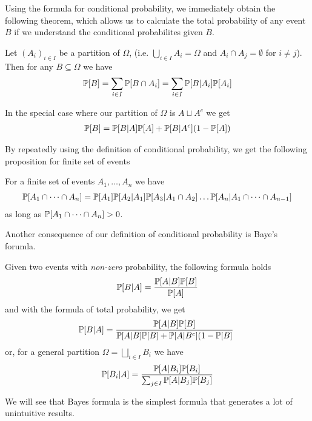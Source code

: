 Using the formula for conditional probability, we immediately obtain the following theorem, which allows us to calculate the total probability of any event $B$ if we understand the conditional probabilites given $B$.
\begin{thm}
  Let $(A_i)_{i \in I}$ be a partition of $\Omega$, (i.e. $\bigcup_{i \in I}A_i = \Omega$ and $A_i \cap A_j = \emptyset$ for $i \neq j$). Then for any $B \subseteq \Omega$ we have
  \begin{align*}
    \mathbb{P}[B] = \sum_{i \in I}\mathbb{P}[B \cap A_i] = \sum_{i \in I}\mathbb{P}[B|A_i]\mathbb{P}[A_i]
  \end{align*}
\end{thm}
In the special case where our partition of $\Omega$ is $A \sqcup A^{c}$ we get
\begin{align*}
  \mathbb{P}[B] = \mathbb{P}[B|A]\mathbb{P}[A] + \mathbb{P}[B|A^{c}](1 - \mathbb{P}[A])
\end{align*}

By repeatedly using the definition of conditional probability, we get the following proposition for finite set of events
\begin{prop}[]
  For a finite set of events $A_{1}, \ldots, A_{n}$ we have
  \begin{align*}
    \mathbb{P}[A_{1}\cap \dots\cap A_{n}] = \mathbb{P}[A_1]\mathbb{P}[A_2|A_1]\mathbb{P}[A_3|A_1 \cap A_2] \dots \mathbb{P}[A_n|A_{1}\cap \dots \cap A_{n-1}]
  \end{align*}
  as long as $\mathbb{P}[A_{1}\cap \dots \cap  A_{n}] > 0$.
\end{prop}


Another consequence of our definition of conditional probability is Baye's forumla.
\begin{cor}
Given two events with \emph{non-zero} probability, the following formula holds
\begin{align*}
  \mathbb{P}[B|A] = \frac{\mathbb{P}[A|B]\mathbb{P}[B]}{\mathbb{P}[A]}
\end{align*}
and with the formula of total probability, we get
\begin{align*}
  \mathbb{P}[B|A] = \frac{\mathbb{P}[A|B] \mathbb{P}[B]}{\mathbb{P}[A|B]\mathbb{P}[B] + \mathbb{P}[A|B^{c}](1 - \mathbb{P}[B]}\
\end{align*}
or, for a general partition $\Omega = \bigsqcup_{i \in I}B_i$ we have
\begin{align*}
  \mathbb{P}[B_i|A] = \frac{\mathbb{P}[A|B_i] \mathbb{P}[B_i]}{\sum_{j \in I}\mathbb{P}[A|B_j]\mathbb{P}[B_j]}
\end{align*}
\end{cor}

We will see that Bayes formula is the simplest formula that generates a lot of unintuitive results.


